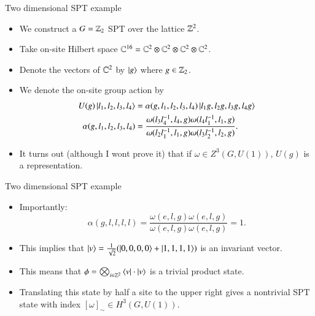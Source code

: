 \documentclass{beamer}
\begin{document}
\begin{frame}{Two dimensional SPT example}
	\begin{itemize}
		\item We construct a $G=\mathbb{Z}_2$ SPT over the lattice $\mathbb{Z}^2$.
		\item Take on-site Hilbert space $\mathbb{C}^{16}=\mathbb{C}^2\otimes\mathbb{C}^2\otimes\mathbb{C}^2\otimes\mathbb{C}^2$.
		\item Denote the vectors of $\mathbb{C}^2$ by $\ket{g}$ where $g\in\mathbb{Z}_2$.
		\item We denote the on-site group action by
		\begin{align}
			U(g)\ket{l_1,l_2,l_3,l_4}&=\alpha(g,l_1,l_2,l_3,l_4)\ket{l_1g,l_2g,l_3g,l_4g}\\
			\alpha(g,l_1,l_2,l_3,l_4)&=\frac{\omega(l_3l_4^{-1},l_4,g)\omega(l_4l_1^{-1},l_1,g)}{\omega(l_2l_1^{-1},l_1,g)\omega(l_3l_2^{-1},l_2,g)}.
		\end{align}
		\item It turns out (although I wont prove it) that if $\omega\in Z^3(G,U(1))$, $U(g)$ is a representation.
	\end{itemize}
\end{frame}

\begin{frame}{Two dimensional SPT example}
	\begin{itemize}
		\item Importantly:
		\[\alpha(g,l,l,l,l)=\frac{\omega(e,l,g)\omega(e,l,g)}{\omega(e,l,g)\omega(e,l,g)}=1.\]
		\item This implies that $\ket{v}=\frac{1}{\sqrt{2}}(\ket{0,0,0,0}+\ket{1,1,1,1})$ is an invariant vector.
		\item This means that $\phi=\bigotimes_{i\in\mathbb{Z}^2}\bra{v}\cdot \ket{v}$ is a trivial product state.
		\item Translating this state by half a site to the upper right gives a nontrivial SPT state with index $[\omega]_\sim\in H^3(G,U(1))$.
	\end{itemize}
\end{frame}
\end{document}
